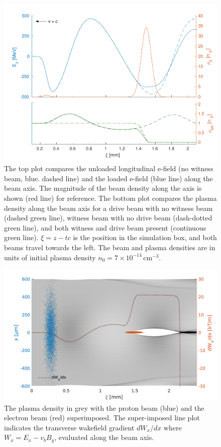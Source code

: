 \documentclass[aps,prstab,reprint,amsmath,amssymb,groupedaddress]{revtex4-1}
\newcommand{\unit}[1]{\,\mathrm{#1}}
\newcommand{\nexp}[1]{\times 10^{#1}}
\begin{document}
\begin{figure}[hbt]
    \includegraphics[width=\linewidth,trim={2mm 0mm 2mm 0mm},clip]{figures/beamLoading}
    \caption{\label{Fig:BeamLoading} The top plot compares the unloaded longitudinal e-field (no witness beam, blue.
        dashed line) and the loaded e-field (blue line) along the beam axis. The magnitude of the beam density along
        the axis is shown (red line) for reference. The bottom plot compares the plasma density along the beam axis for
        a drive beam with no witness beam (dashed green line), witness beam with no drive beam (dash-dotted green line),
        and both witness and drive beam present (continuous green line). $\xi = z - tc$ is the position in the
        simulation box, and both beams travel towards the left. The beam and plasma densities are in units of initial
        plasma density $n_{0} = 7\nexp{-14}\unit{cm}^{-3}$.}
\end{figure}

\begin{figure}[hbt]
    \includegraphics[width=\linewidth,trim={2mm 0mm 2mm 0mm},clip]{figures/plasmaDenTWake}
    \caption{\label{Fig:PlasmaDenTWake} The plasma density in grey with the proton beam (blue) and the electron beam
        (red) superimposed. The super-imposed line plot indicates the transverse wakefield gradient $dW_{x}/dx$ where
        $W_{x} = E_{x} - v_{b} B_{y}$, evaluated along the beam axis.}
\end{figure}
\end{document}
